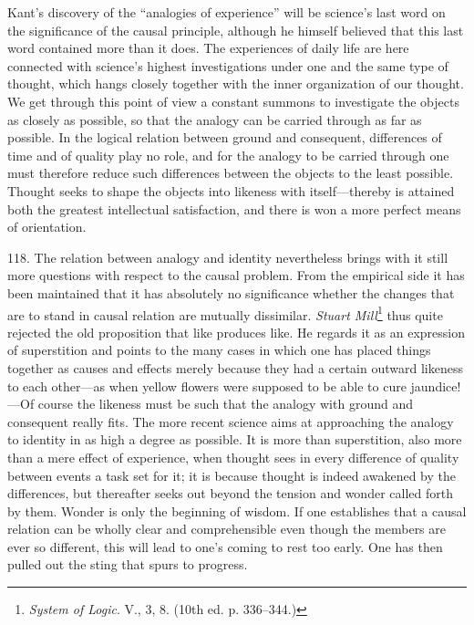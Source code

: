 \documentclass[12pt,a4paper]{book}
\newcommand{\opage}[1]{\marginnote{\footnotesize\textit{[#1]}}}
\begin{document}
Kant's discovery of the ``analogies of experience'' will be science's last word
on the significance of the causal principle, although he himself believed that
this last word contained more than it does. The experiences of daily life are
here connected with science's highest investigations under one and the same
type of thought, which hangs closely together with the inner organization of
our thought. We get through this point of view a constant summons to investigate
the objects as closely as possible, so that \opage{281}the analogy can be carried through
as far as possible. In the logical relation between ground and consequent,
differences of time and of quality play no role, and for the analogy to be
carried through one must therefore reduce such differences between the objects
to the least possible. Thought seeks to shape the objects into likeness with
itself---thereby is attained both the greatest intellectual satisfaction, and
there is won a more perfect means of orientation.

118. The relation between analogy and identity nevertheless brings with it still
more questions with respect to the causal problem. From the empirical side it
has been maintained that it has absolutely no significance whether the changes
that are to stand in causal relation are mutually dissimilar. \emph{Stuart
Mill}\footnote{\emph{System of Logic}. V., 3, 8. (10th ed. p. 336--344.)} thus
quite rejected the old proposition that like produces like. He regards it as an
expression of superstition and points to the many cases in which one has placed
things together as causes and effects merely because they had a certain outward
likeness to each other---as when yellow flowers were supposed to be able to cure
jaundice!---Of course the likeness must be such that the analogy with ground and
consequent really fits. The more recent science aims at approaching the analogy
to identity in as high a degree as possible. It is more than superstition, also
more than a mere effect of experience, when thought sees in every difference of
quality between events a task set for it; it is because thought is indeed
awakened by the differences, but thereafter seeks out beyond the tension and
wonder called forth by them. Wonder is only the beginning of wisdom. If one
establishes that a causal relation can be wholly clear and comprehensible even
though the members are ever so different, this will lead to one's coming to rest
too early. One has then pulled out the sting that spurs to progress.
\end{document}
